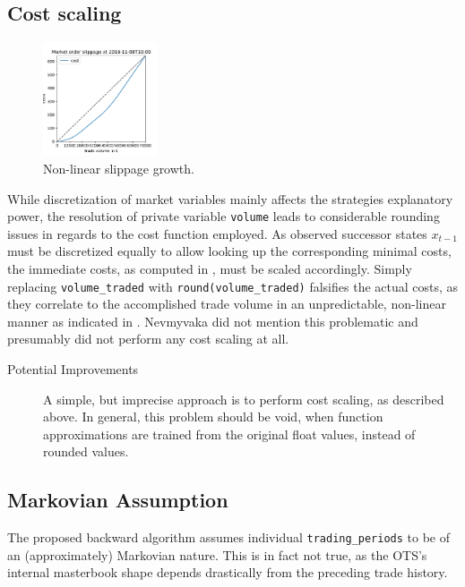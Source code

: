 \subsection{Cost scaling}
\label{chap:backwardalgorithm:discussion:costscaling}
\begin{figure}
	\centering
	\includegraphics[width=0.3\textwidth]{content/drawings/nonlinearcosts}
	\caption{Non-linear slippage growth.}
	\label{fig:nonlinearcosts}
\end{figure}
While discretization of market variables mainly affects the strategies explanatory power, the resolution of private variable \lstinline!volume! leads to considerable rounding issues in regards to the cost function employed. As observed successor states $x_{t-1}$ must be discretized equally to allow looking up the corresponding minimal costs, the immediate costs, as computed in , must be scaled accordingly. Simply replacing \lstinline!volume_traded! with \lstinline!round(volume_traded)! falsifies the actual costs, as they correlate to the accomplished trade volume in an  unpredictable, non-linear manner as indicated in . Nevmyvaka \etal \Cite{Nevmyvaka:2006} did not mention this problematic and presumably did not perform any cost scaling at all.

\begin{description}
\item[Potential Improvements]  A simple, but imprecise approach is to perform cost scaling, as described above. In general, this problem should be void, when function approximations are trained from the original float values, instead of rounded values.
\end{description}


\subsection{Markovian Assumption}
\label{chap:backwardalgorithm:discussion:markovianassumption}
The proposed backward algorithm assumes individual \lstinline!trading_periods! to be of an (approximately) Markovian nature. This is in fact not true, as the \ac{OTS}'s internal masterbook shape depends drastically from the preceding trade history.\\

